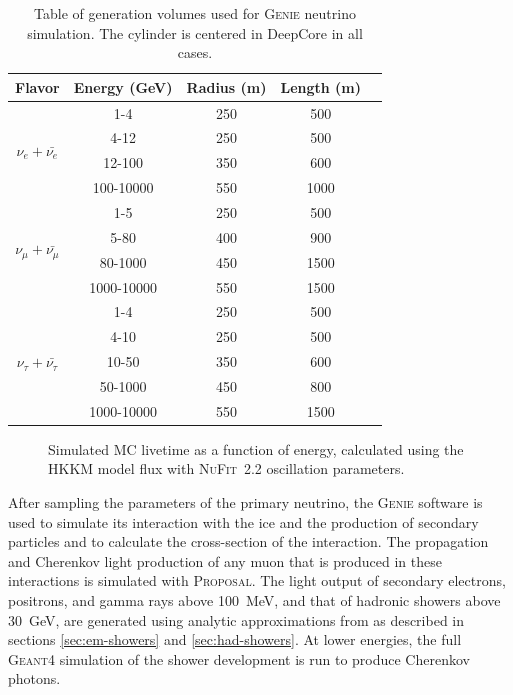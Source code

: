 \begin{table}
\caption{Table of generation volumes used for \textsc{Genie} neutrino simulation. The cylinder is centered in DeepCore in all cases. \label{table:GENIE}}
\begin{center}
\begin{tabular}{ ccccc }
\textbf{Flavor} & \textbf{Energy (GeV)} & \textbf{Radius (m)} & \textbf{Length (m)}\\
\toprule
\multirow{4}{*}{$\nu_e+\bar{\nu_e}$}  & 1-4 & 250 & 500 \\
 & 4-12 & 250 & 500   \\
 & 12-100 & 350 & 600  \\
 & 100-10000 & 550 & 1000  \\
 \midrule
\multirow{4}{*}{$\nu_{\mu}+\bar{\nu_{\mu}}$} & 1-5 & 250 & 500\\
 & 5-80 & 400 & 900\\
 & 80-1000 & 450 & 1500\\
 & 1000-10000 & 550 & 1500\\
 \midrule
\multirow{5}{*}{$\nu_{\tau}+\bar{\nu_{\tau}}$} & 1-4 & 250 & 500\\
 & 4-10 & 250 & 500\\
 & 10-50 & 350 & 600\\
 & 50-1000 & 450 & 800\\
 & 1000-10000 & 550 & 1500\\
 \bottomrule
\end{tabular}
\end{center}
\end{table}

\begin{figure}
    \centering
    
    \caption{Simulated MC livetime as a function of energy, calculated using the HKKM\cite{Honda:2015fha} model flux with \textsc{NuFit}~2.2\cite{nufit22} oscillation parameters.}
    \label{fig:sim-livetime}
\end{figure}

After sampling the parameters of the primary neutrino, the \textsc{Genie} software is used to simulate its interaction with the ice and the production of secondary particles and to calculate the cross-section of the interaction.
The propagation and Cherenkov light production of any muon that is produced in these interactions is simulated with \textsc{Proposal}.
The light output of secondary electrons, positrons, and gamma rays above 100~MeV, and that of hadronic showers above 30~GeV, are generated using analytic approximations from \cite{RADEL2013102} as described in sections \ref{sec:em-showers} and \ref{sec:had-showers}.
At lower energies, the full \textsc{Geant4} simulation of the shower development is run to produce Cherenkov photons.

